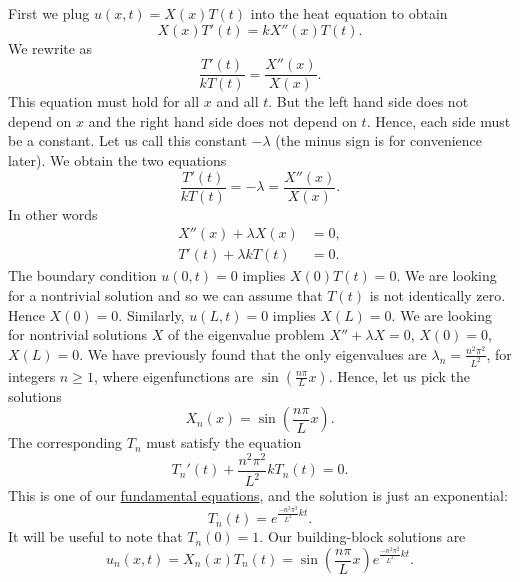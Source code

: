 First we plug $u(x,t) = X(x)T(t)$ into the heat equation to
obtain
\begin{equation*}
X(x)T'(t) = k X''(x)T(t) .
\end{equation*}
We rewrite as
\begin{equation*}
\frac{T'(t)}{k T(t)} =
\frac{X''(x)}{X(x)} .
\end{equation*}
This equation must hold for all $x$ and all $t$.  But the left
hand side does not depend on $x$ and the right hand side does not
depend on $t$.  Hence, each side must be a constant.  Let us call this
constant $-\lambda$ (the minus sign is for convenience later).
We obtain the two equations
\begin{equation*}
\frac{T'(t)}{k T(t)} = -\lambda =
\frac{X''(x)}{X(x)} .
\end{equation*}
In other words
\begin{align*}
X''(x) + \lambda X(x) &= 0 , \\
T'(t) + \lambda k T(t) &= 0 .
\end{align*}
The boundary condition $u(0,t) = 0$ implies $X(0)T(t) = 0$.  We are looking
for a nontrivial solution and so we can assume that $T(t)$ is not identically
zero.  Hence $X(0) = 0$.  Similarly, $u(L,t) = 0$ implies $X(L) = 0$.  We
are looking for nontrivial solutions $X$ of the eigenvalue problem
$X'' + \lambda X = 0$, $X(0) = 0$, $X(L) = 0$.  We have previously found that
the only eigenvalues are $\lambda_n = \frac{n^2 \pi^2}{L^2}$, for integers
$n \geq 1$,
where eigenfunctions are $\sin \left(\frac{n \pi}{L} x\right)$.  Hence, let us pick
the solutions
\begin{equation*}
X_n (x) = \sin \left(\frac{n \pi}{L} x \right) .
\end{equation*}
The corresponding $T_n$ must satisfy the equation
\begin{equation*}
T_n'(t) + \frac{n^2 \pi^2}{L^2} k T_n(t) = 0 .
\end{equation*}
This is one of our
\hyperref[subsection:fourfundamental]{fundamental equations},
and the solution is just
an exponential:
\begin{equation*}
T_n(t) = e^{\frac{-n^2 \pi^2}{L^2} k t} .
\end{equation*}
It will be useful to note that $T_n(0) = 1$.
Our building-block solutions are
\begin{equation*}
u_n(x,t) = X_n(x)T_n(t) =
\sin \left( \frac{n \pi}{L} x \right)
e^{\frac{-n^2 \pi^2}{L^2} k t} .
\end{equation*}

